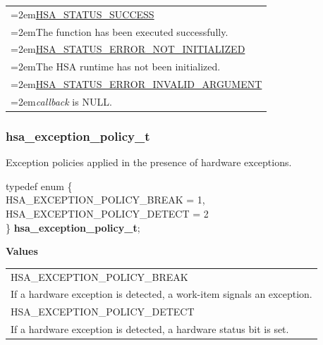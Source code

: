 \documentclass[final,oneside]{book}
\newcommand{\reftyp}[1]{#1}
\newcommand{\refenu}[1]{\reftyp{#1}}
\newenvironment{mylongtable}{\rowcolors{0}{lightgray}{lightgray}\longtable} {
\endlongtable}
\begin{document}
\noindent\begin{longtable}{@{}>{\hangindent=2em}p{\linewidth}}
\hyperlink{group__status_1ggad755322e7ff95456520e8abdbe90d225ae382ea0c9c05cce5a60d0317375159cc}{HSA_\-STATUS_\-SUCCESS}\\\hspace{2em}The function has been executed successfully.\\[2mm]
\hyperlink{group__status_1ggad755322e7ff95456520e8abdbe90d225a34ea59ade5bfce95eee935238a99f5b5}{HSA_\-STATUS_\-ERROR_\-NOT_\-INITIALIZED}\\\hspace{2em}The HSA runtime has not been initialized.\\[2mm]
\hyperlink{group__status_1ggad755322e7ff95456520e8abdbe90d225ac7d3651f75107d2a6a8ba3b25683c030}{HSA_\-STATUS_\-ERROR_\-INVALID_\-ARGUMENT}\\\hspace{2em}\textit{callback} is NULL.
\end{longtable}
\vspace{-2mm} 


\subsubsection{hsa_\-exception_\-policy_\-t}
\vspace{-2.5mm}Exception policies applied in the presence of hardware exceptions.\begin{mylongtable}{@{}p{\textwidth}}
\rule{0pt}{3ex}typedef enum \{\\\hspace{1.7em}\hypertarget{group__agentinfo_1ggadaa0623d4a3fb29ba3fa4a6eb2a74c80abb658932003f9578f13ab0c28830cfd6}{\refenu{HSA_\-EXCEPTION_\-POLICY_\-BREAK}} = 1,\\
\hspace{1.7em}\hypertarget{group__agentinfo_1ggadaa0623d4a3fb29ba3fa4a6eb2a74c80a219b3c9b41ed3abd4f9b20f026b533d5}{\refenu{HSA_\-EXCEPTION_\-POLICY_\-DETECT}} = 2\\
\} \hypertarget{group__agentinfo_1gadaa0623d4a3fb29ba3fa4a6eb2a74c80}{\textbf{hsa_\-exception_\-policy_\-t}};\rule[-2ex]{0pt}{0pt}\end{mylongtable}\noindent\textbf{Values}\\[-7mm]
\begin{longtable}{@{\hspace{2em}}p{\linewidth-2em}}
\hspace{-2em}\refenu{HSA_\-EXCEPTION_\-POLICY_\-BREAK}\\If a hardware exception is detected, a work-item signals an exception.\\[2mm]
\hspace{-2em}\refenu{HSA_\-EXCEPTION_\-POLICY_\-DETECT}\\If a hardware exception is detected, a hardware status bit is set.
\end{longtable}
\end{document}
